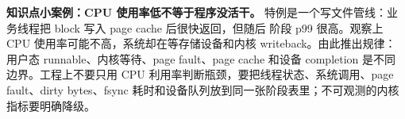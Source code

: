 \begin{casebox}
\textbf{知识点小案例：CPU 使用率低不等于程序没活干。}
特例是一个写文件管线：业务线程把 block 写入 page cache 后很快返回，但随后  阶段 p99 很高。观察上 CPU 使用率可能不高，系统却在等存储设备和内核 writeback。由此推出规律：用户态 runnable、内核等待、page fault、page cache 和设备 completion 是不同边界。工程上不要只用 CPU 利用率判断瓶颈，要把线程状态、系统调用、page fault、dirty bytes、fsync 耗时和设备队列放到同一张阶段表里；不可观测的内核指标要明确降级。
\end{casebox}
